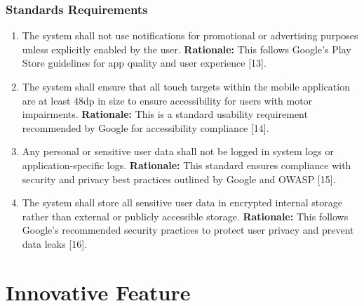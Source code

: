\documentclass[]{article}
\begin{document}

\subsubsection{Standards Requirements}
\label{ssub:standards_requirements}
\begin{enumerate}[{LR-STD}1. ]
	\item The system shall not use notifications for promotional or advertising purposes unless explicitly enabled by the user. 
    \newline \textbf{Rationale:} This follows Google’s Play Store guidelines for app quality and user experience [13].

    \item The system shall ensure that all touch targets within the mobile application are at least 48dp in size to ensure accessibility for users with motor impairments. 
    \newline \textbf{Rationale:} This is a standard usability requirement recommended by Google for accessibility compliance [14].

    \item Any personal or sensitive user data shall not be logged in system logs or application-specific logs. 
    \newline \textbf{Rationale:} This standard ensures compliance with security and privacy best practices outlined by Google and OWASP [15].

    \item The system shall store all sensitive user data in encrypted internal storage rather than external or publicly accessible storage. 
    \newline \textbf{Rationale:} This follows Google’s recommended security practices to protect user privacy and prevent data leaks [16]. 
\end{enumerate}




\section{Innovative Feature}
\label{sec:innovative-feature}
\end{document}
